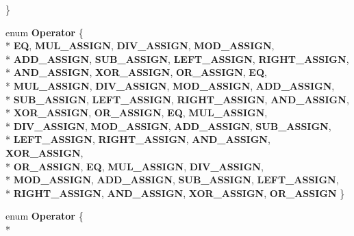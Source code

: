 \begin{DoxyCompactItemize}
 \}
\item 
enum {\bfseries Operator} \{ \\*
{\bfseries E\-Q}, 
{\bfseries M\-U\-L\-\_\-\-A\-S\-S\-I\-G\-N}, 
{\bfseries D\-I\-V\-\_\-\-A\-S\-S\-I\-G\-N}, 
{\bfseries M\-O\-D\-\_\-\-A\-S\-S\-I\-G\-N}, 
\\*
{\bfseries A\-D\-D\-\_\-\-A\-S\-S\-I\-G\-N}, 
{\bfseries S\-U\-B\-\_\-\-A\-S\-S\-I\-G\-N}, 
{\bfseries L\-E\-F\-T\-\_\-\-A\-S\-S\-I\-G\-N}, 
{\bfseries R\-I\-G\-H\-T\-\_\-\-A\-S\-S\-I\-G\-N}, 
\\*
{\bfseries A\-N\-D\-\_\-\-A\-S\-S\-I\-G\-N}, 
{\bfseries X\-O\-R\-\_\-\-A\-S\-S\-I\-G\-N}, 
{\bfseries O\-R\-\_\-\-A\-S\-S\-I\-G\-N}, 
{\bfseries E\-Q}, 
\\*
{\bfseries M\-U\-L\-\_\-\-A\-S\-S\-I\-G\-N}, 
{\bfseries D\-I\-V\-\_\-\-A\-S\-S\-I\-G\-N}, 
{\bfseries M\-O\-D\-\_\-\-A\-S\-S\-I\-G\-N}, 
{\bfseries A\-D\-D\-\_\-\-A\-S\-S\-I\-G\-N}, 
\\*
{\bfseries S\-U\-B\-\_\-\-A\-S\-S\-I\-G\-N}, 
{\bfseries L\-E\-F\-T\-\_\-\-A\-S\-S\-I\-G\-N}, 
{\bfseries R\-I\-G\-H\-T\-\_\-\-A\-S\-S\-I\-G\-N}, 
{\bfseries A\-N\-D\-\_\-\-A\-S\-S\-I\-G\-N}, 
\\*
{\bfseries X\-O\-R\-\_\-\-A\-S\-S\-I\-G\-N}, 
{\bfseries O\-R\-\_\-\-A\-S\-S\-I\-G\-N}, 
{\bfseries E\-Q}, 
{\bfseries M\-U\-L\-\_\-\-A\-S\-S\-I\-G\-N}, 
\\*
{\bfseries D\-I\-V\-\_\-\-A\-S\-S\-I\-G\-N}, 
{\bfseries M\-O\-D\-\_\-\-A\-S\-S\-I\-G\-N}, 
{\bfseries A\-D\-D\-\_\-\-A\-S\-S\-I\-G\-N}, 
{\bfseries S\-U\-B\-\_\-\-A\-S\-S\-I\-G\-N}, 
\\*
{\bfseries L\-E\-F\-T\-\_\-\-A\-S\-S\-I\-G\-N}, 
{\bfseries R\-I\-G\-H\-T\-\_\-\-A\-S\-S\-I\-G\-N}, 
{\bfseries A\-N\-D\-\_\-\-A\-S\-S\-I\-G\-N}, 
{\bfseries X\-O\-R\-\_\-\-A\-S\-S\-I\-G\-N}, 
\\*
{\bfseries O\-R\-\_\-\-A\-S\-S\-I\-G\-N}, 
{\bfseries E\-Q}, 
{\bfseries M\-U\-L\-\_\-\-A\-S\-S\-I\-G\-N}, 
{\bfseries D\-I\-V\-\_\-\-A\-S\-S\-I\-G\-N}, 
\\*
{\bfseries M\-O\-D\-\_\-\-A\-S\-S\-I\-G\-N}, 
{\bfseries A\-D\-D\-\_\-\-A\-S\-S\-I\-G\-N}, 
{\bfseries S\-U\-B\-\_\-\-A\-S\-S\-I\-G\-N}, 
{\bfseries L\-E\-F\-T\-\_\-\-A\-S\-S\-I\-G\-N}, 
\\*
{\bfseries R\-I\-G\-H\-T\-\_\-\-A\-S\-S\-I\-G\-N}, 
{\bfseries A\-N\-D\-\_\-\-A\-S\-S\-I\-G\-N}, 
{\bfseries X\-O\-R\-\_\-\-A\-S\-S\-I\-G\-N}, 
{\bfseries O\-R\-\_\-\-A\-S\-S\-I\-G\-N}
 \}
\item 
enum {\bfseries Operator} \{ \\*

\end{DoxyCompactItemize}
